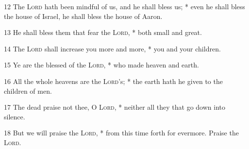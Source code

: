 12 The {\textsc{Lord}} hath been mindful of us, and he shall bless us; * even he shall bless the house of Israel, he shall bless the house of Aaron.\par
13 He shall bless them that fear the {\textsc{Lord}}, * both small and great.\par
14 The {\textsc{Lord}} shall increase you more and more, * you and your children.\par
15 Ye are the blessed of the {\textsc{Lord}}, * who made heaven and earth.\par
16 All the whole heavens are the {\textsc{Lord}}'s; * the earth hath he given to the children of men.\par
17 The dead praise not thee, O {\textsc{Lord}}, * neither all they that go down into silence.\par
18 But we will praise the {\textsc{Lord}}, * from this time forth for evermore. Praise the {\textsc{Lord}}.
